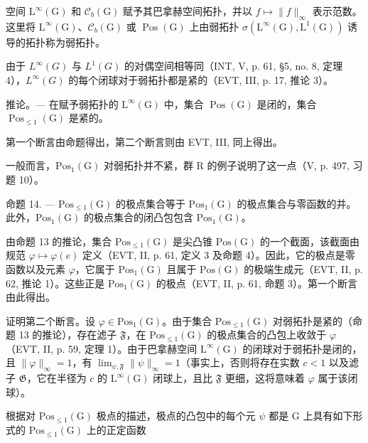 空间 \(\mathrm{L}^{\infty}(\mathrm{G})\) 和 \(\mathcal{C}_{b}(\mathrm{G})\) 赋予其巴拿赫空间拓扑，并以 \(f \mapsto \|f\|_{\infty}\) 表示范数。这里将 \(\mathrm{L}^{\infty}(\mathrm{G})\)、\(\mathcal{C}_{b}(\mathrm{G})\) 或 \(\operatorname{Pos}(\mathrm{G})\) 上由弱拓扑 \(\sigma(\mathrm{L}^{\infty}(\mathrm{G}), \mathrm{L}^{1}(\mathrm{G}))\) 诱导的拓扑称为弱拓扑。

由于 \(L^{\infty}(G)\) 与 \(L^{1}(G)\) 的对偶空间相等同（INT, V, p. 61, §5, no. 8, 定理 4），\(L^{\infty}(G)\) 的每个闭球对于弱拓扑都是紧的（EVT, III, p. 17, 推论 3）。

推论。--- 在赋予弱拓扑的 \(\mathrm{L}^{\infty}(\mathrm{G})\) 中，集合 \(\operatorname{Pos}(\mathrm{G})\) 是闭的，集合 \(\operatorname{Pos}_{\leqslant 1}(\mathrm{G})\) 是紧的。

第一个断言由命题得出，第二个断言则由 EVT, III, 同上得出。

一般而言，\(\mathrm{Pos}_{1}(\mathrm{G})\) 对弱拓扑并不紧，群 R 的例子说明了这一点（V, p. 497, 习题 10）。

命题 14. --- \(\mathrm{Pos}_{\leqslant 1}(\mathrm{G})\) 的极点集合等于 \(\mathrm{Pos}_1(\mathrm{G})\) 的极点集合与零函数的并。此外，\(\mathrm{Pos}_1(\mathrm{G})\) 的极点集合的闭凸包包含 \(\mathrm{Pos}_1(\mathrm{G})\)。

由命题 13 的推论，集合 \(\mathrm{Pos}_{\leqslant 1}(\mathrm{G})\) 是尖凸锥 \(\mathrm{Pos}(\mathrm{G})\) 的一个截面，该截面由规范 \(\varphi \mapsto \varphi(e)\) 定义（EVT, II, p. 61, 定义 3 及命题 4）。因此，它的极点是零函数以及元素 \(\varphi\)，它属于 \(\mathrm{Pos}_1(\mathrm{G})\) 且属于 \(\mathrm{Pos}(\mathrm{G})\) 的极端生成元（EVT, II, p. 62, 推论 1）。这些正是 \(\mathrm{Pos}_1(\mathrm{G})\) 的极点（EVT, II, p. 61, 命题 3）。第一个断言由此得出。

证明第二个断言。设 \(\varphi\in\mathrm{Pos}_{1}(\mathrm{G})\)。由于集合 \(\mathrm{Pos}_{\leqslant 1}(\mathrm{G})\) 对弱拓扑是紧的（命题 13 的推论），存在滤子 \(\mathfrak{F}\)，在 \(\mathrm{Pos}_{\leqslant 1}(\mathrm{G})\) 的极点集合的凸包上收敛于 \(\varphi\)（EVT, II, p. 59, 定理 1）。由于巴拿赫空间 \(\mathrm{L}^{\infty}(\mathrm{G})\) 的闭球对于弱拓扑是闭的，且 \(\|\varphi\|_{\infty}=1\)，有 \(\lim_{\psi,\mathfrak{F}}\|\psi\|_{\infty}=1\)（事实上，否则将存在实数 \(c<1\) 以及滤子 \(\mathfrak{G}\)，它在半径为 \(c\) 的 \(\mathrm{L}^{\infty}(\mathrm{G})\) 闭球上，且比 \(\mathfrak{F}\) 更细，这将意味着 \(\varphi\) 属于该闭球）。

根据对 \(\mathrm{Pos}_{\leqslant1}(\mathrm{G})\) 极点的描述，极点的凸包中的每个元 \(\psi\) 都是 G 上具有如下形式的 \(\mathrm{Pos}_{\leqslant1}(\mathrm{G})\) 上的正定函数


